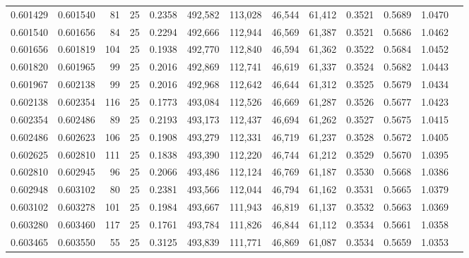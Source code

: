 \begin{tabular}{rrrrrrrrrrrrr}
0.601429 & 0.601540 &    81 &  25 &                                     0.2358 & 492,582 & 113,028 &  46,544 &  61,412 & 0.3521 & 0.5689 & 1.0470 \\
0.601540 & 0.601656 &    84 &  25 &                                     0.2294 & 492,666 & 112,944 &  46,569 &  61,387 & 0.3521 & 0.5686 & 1.0462 \\
0.601656 & 0.601819 &   104 &  25 &                                     0.1938 & 492,770 & 112,840 &  46,594 &  61,362 & 0.3522 & 0.5684 & 1.0452 \\
0.601820 & 0.601965 &    99 &  25 &                                     0.2016 & 492,869 & 112,741 &  46,619 &  61,337 & 0.3524 & 0.5682 & 1.0443 \\
0.601967 & 0.602138 &    99 &  25 &                                     0.2016 & 492,968 & 112,642 &  46,644 &  61,312 & 0.3525 & 0.5679 & 1.0434 \\
0.602138 & 0.602354 &   116 &  25 &                                     0.1773 & 493,084 & 112,526 &  46,669 &  61,287 & 0.3526 & 0.5677 & 1.0423 \\
0.602354 & 0.602486 &    89 &  25 &                                     0.2193 & 493,173 & 112,437 &  46,694 &  61,262 & 0.3527 & 0.5675 & 1.0415 \\
0.602486 & 0.602623 &   106 &  25 &                                     0.1908 & 493,279 & 112,331 &  46,719 &  61,237 & 0.3528 & 0.5672 & 1.0405 \\
0.602625 & 0.602810 &   111 &  25 &                                     0.1838 & 493,390 & 112,220 &  46,744 &  61,212 & 0.3529 & 0.5670 & 1.0395 \\
0.602810 & 0.602945 &    96 &  25 &                                     0.2066 & 493,486 & 112,124 &  46,769 &  61,187 & 0.3530 & 0.5668 & 1.0386 \\
0.602948 & 0.603102 &    80 &  25 &                                     0.2381 & 493,566 & 112,044 &  46,794 &  61,162 & 0.3531 & 0.5665 & 1.0379 \\
0.603102 & 0.603278 &   101 &  25 &                                     0.1984 & 493,667 & 111,943 &  46,819 &  61,137 & 0.3532 & 0.5663 & 1.0369 \\
0.603280 & 0.603460 &   117 &  25 &                                     0.1761 & 493,784 & 111,826 &  46,844 &  61,112 & 0.3534 & 0.5661 & 1.0358 \\
0.603465 & 0.603550 &    55 &  25 &                                     0.3125 & 493,839 & 111,771 &  46,869 &  61,087 & 0.3534 & 0.5659 & 1.0353 \\

\end{tabular}
